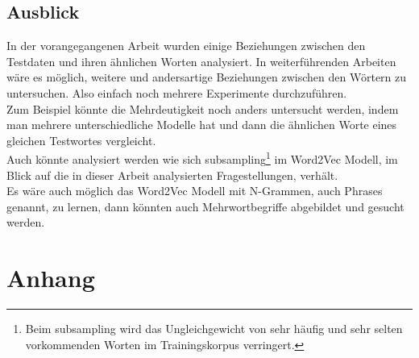 \documentclass[12pt,a4paper]{report}
\begin{document}
\section{Ausblick}

In der vorangegangenen Arbeit wurden einige Beziehungen zwischen den Testdaten und ihren ähnlichen Worten analysiert. In weiterführenden Arbeiten wäre es möglich, weitere und andersartige Beziehungen zwischen den Wörtern zu untersuchen. Also einfach noch mehrere Experimente durchzuführen.\\
Zum Beispiel könnte die Mehrdeutigkeit noch anders untersucht werden, indem man mehrere unterschiedliche Modelle hat und dann die ähnlichen Worte eines gleichen Testwortes vergleicht.\\

Auch könnte analysiert werden wie sich subsampling\footnote{Beim subsampling wird das Ungleichgewicht von sehr häufig und sehr selten vorkommenden Worten im Trainingskorpus verringert\citep{DBLP:journals/corr/MikolovSCCD13}. } im Word2Vec Modell, im Blick auf die in dieser Arbeit analysierten Fragestellungen, verhält.\\
Es wäre auch möglich das Word2Vec Modell mit N-Grammen, auch Phrases genannt, zu lernen, dann könnten auch Mehrwortbegriffe abgebildet und gesucht werden.





\newpage


\nocite{DBLP:conf/naacl/MikolovYZ13}

\listoftables
\listoffigures 




\chapter{Anhang}
\end{document}
